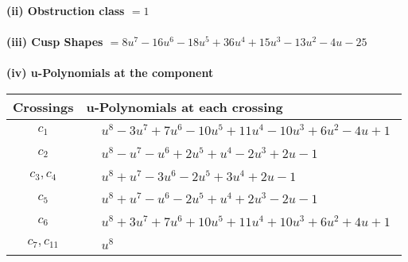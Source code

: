 \documentclass[1p]{elsarticle_modified}
\theoremstyle{definition}
\begin{document}
\flushleft \textbf{(ii) Obstruction class $= 1$}\\~\\
\flushleft \textbf{(iii) Cusp Shapes $= 8 u^7-16 u^6-18 u^5+36 u^4+15 u^3-13 u^2-4 u-25$}\\~\\
\newpage\renewcommand{\arraystretch}{1}
\flushleft \textbf{(iv) u-Polynomials at the component}\newline \\
\begin{tabular}{m{50pt}|m{274pt}}
Crossings & \hspace{64pt}u-Polynomials at each crossing \\
\hline $$\begin{aligned}c_{1}\end{aligned}$$&$\begin{aligned}
&u^8-3 u^7+7 u^6-10 u^5+11 u^4-10 u^3+6 u^2-4 u+1
\end{aligned}$\\
\hline $$\begin{aligned}c_{2}\end{aligned}$$&$\begin{aligned}
&u^8- u^7- u^6+2 u^5+u^4-2 u^3+2 u-1
\end{aligned}$\\
\hline $$\begin{aligned}c_{3},c_{4}\end{aligned}$$&$\begin{aligned}
&u^8+u^7-3 u^6-2 u^5+3 u^4+2 u-1
\end{aligned}$\\
\hline $$\begin{aligned}c_{5}\end{aligned}$$&$\begin{aligned}
&u^8+u^7- u^6-2 u^5+u^4+2 u^3-2 u-1
\end{aligned}$\\
\hline $$\begin{aligned}c_{6}\end{aligned}$$&$\begin{aligned}
&u^8+3 u^7+7 u^6+10 u^5+11 u^4+10 u^3+6 u^2+4 u+1
\end{aligned}$\\
\hline $$\begin{aligned}c_{7},c_{11}\end{aligned}$$&$\begin{aligned}
&u^8
\end{aligned}$\\

\end{tabular}
\end{document}
